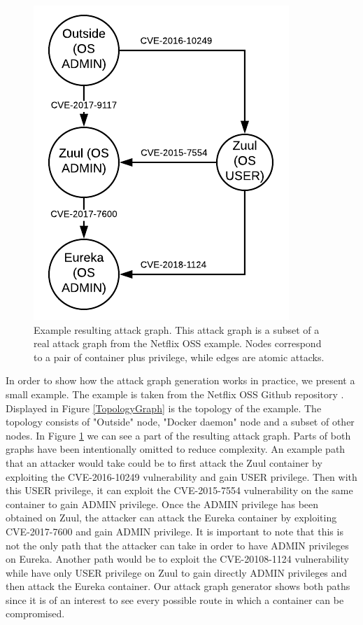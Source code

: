 \begin{figure}
	\includegraphics[]{./images/Attack_graph}
	\caption{Example resulting attack graph. This attack graph is a subset of a real attack graph from the Netflix OSS example. Nodes correspond to a pair of container plus privilege, while edges are atomic attacks.}
	\label{AttackGraph}
\end{figure}

In order to show how the attack graph generation works in practice, we present a small example. The example is taken from the Netflix OSS Github repository \cite{netflixoss}. Displayed in Figure \ref{TopologyGraph} is the topology of the example. The topology consists of "Outside" node, "Docker daemon" node and a subset of other nodes. In Figure \ref{AttackGraph} we can see a part of the resulting attack graph. Parts of both graphs have been intentionally omitted to reduce complexity. An example path that an attacker would take could be to first attack the Zuul container by exploiting the CVE-2016-10249 vulnerability and gain USER privilege. Then with this USER privilege, it can exploit the CVE-2015-7554 vulnerability on the same container to gain ADMIN privilege. Once the ADMIN privilege has been obtained on Zuul, the attacker can attack the Eureka container by exploiting CVE-2017-7600 and gain ADMIN privilege. It is important to note that this is not the only path that the attacker can take in order to have ADMIN privileges on Eureka. Another path would be to exploit the CVE-20108-1124 vulnerability while have only USER privilege on Zuul to gain directly ADMIN privileges and then attack the Eureka container. Our attack graph generator shows both paths since it is of an interest to see every possible route in which a container can be compromised.

